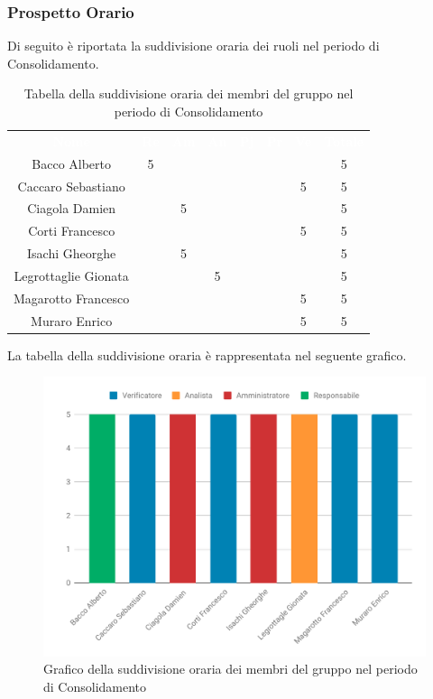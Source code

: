 \subsubsection{Prospetto Orario}
Di seguito è riportata la suddivisione oraria dei ruoli nel periodo di Consolidamento.




\begin{table}[H]	
	\begin{center}
	    \begin{tabular}{cccccccc}
	  		
			\rowcolor{greySWEight}
			\textcolor{white}{\textbf{Nome}} & \textcolor{white}{\textbf{Re}} & \textcolor{white}{\textbf{Am}} & \textcolor{white}{\textbf{An}} & \textcolor{white}{\textbf{Pj}} & \textcolor{white}{\textbf{Pr}} & \textcolor{white}{\textbf{Ve}} & \textcolor{white}{\textbf{Totale}}
			\\
			Bacco Alberto & 5 & & & & & & 5 \\
			Caccaro Sebastiano & & & & & & 5 & 5 \\
			Ciagola Damien & & 5 & & & & & 5 \\
			Corti Francesco & & & & & & 5 & 5 \\
			Isachi Gheorghe & & 5 & & & & & 5 \\
			Legrottaglie Gionata & & & 5 & & & & 5 \\
			Magarotto Francesco & & & & & & 5 & 5 \\
			Muraro Enrico & & & & & & 5 & 5 \\

			\end{tabular}
	    \caption{Tabella della suddivisione oraria dei membri del gruppo nel periodo di Consolidamento} \label{tab:tabellaPersoneConsolidamento} 
	\end{center}
\end{table}

La tabella della suddivisione oraria è rappresentata nel seguente grafico.
\begin{figure}[H]
	\includegraphics[width=1\linewidth]{Preventivo/grafici/CO1.pdf}
	\caption{Grafico della suddivisione oraria dei membri del gruppo nel periodo di Consolidamento}
\end{figure}

